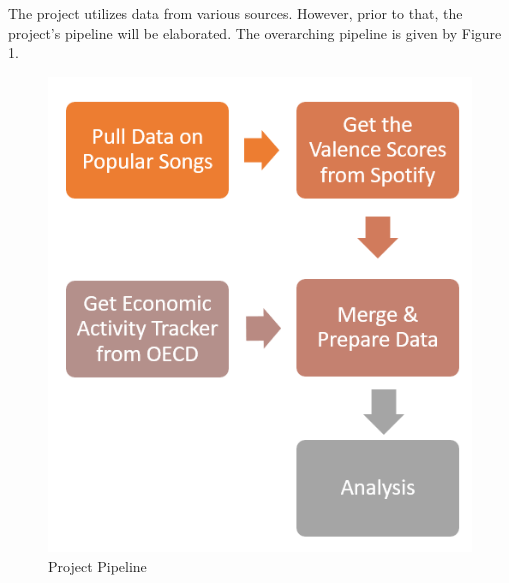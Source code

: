 \documentclass[12pt]{article}
\begin{document}
The project utilizes data from various sources. However, prior to that, the project's pipeline will be elaborated. The overarching pipeline is given by Figure 1. 
\begin{figure}[h!]
\centering
\includegraphics[scale=0.4]{pipeline.png}
\caption{Project Pipeline}
\end{figure}
\end{document}
